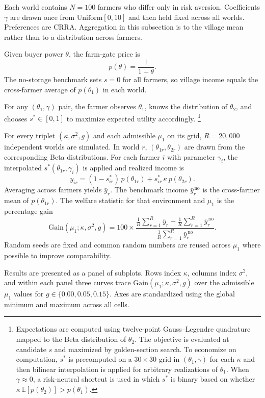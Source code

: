 Each world contains $N=100$ farmers who differ only in risk aversion. Coefficients $\gamma$ are drawn once from $\mathrm{Uniform}[0,10]$ and then held fixed across all worlds. Preferences are CRRA. Aggregation in this subsection is to the village mean rather than to a distribution across farmers.

Given buyer power $\theta$, the farm-gate price is
\[
p(\theta)=\frac{1}{1+\theta}.
\]
The no-storage benchmark sets $s=0$ for all farmers, so village income equals the cross-farmer average of $p(\theta_1)$ in each world.

For any $(\theta_1,\gamma)$ pair, the farmer observes $\theta_1$, knows the distribution of $\theta_2$, and chooses $s^*\in[0,1]$ to maximize expected utility accordingly. \footnote{Expectations are computed using twelve-point Gauss--Legendre quadrature mapped to the Beta distribution of $\theta_2$. The objective is evaluated at candidate $s$ and maximized by golden-section search. To economize on computation, $s^*$ is precomputed on a $30\times 30$ grid in $(\theta_1,\gamma)$ for each $\kappa$ and then bilinear interpolation is applied for arbitrary realizations of $\theta_1$. When $\gamma\approx 0$, a risk-neutral shortcut is used in which $s^*$ is binary based on whether $\kappa\,\mathbb{E}[p(\theta_2)]>p(\theta_1)$.}

For every triplet $(\kappa,\sigma^2,g)$ and each admissible $\mu_1$ on its grid, $R=20{,}000$ independent worlds are simulated. In world $r$, $(\theta_{1r},\theta_{2r})$ are drawn from the corresponding Beta distributions. For each farmer $i$ with parameter $\gamma_i$, the interpolated $s^*(\theta_{1r},\gamma_i)$ is applied and realized income is
\[
y_{ir}=(1-s^*_{ir})\,p(\theta_{1r})+s^*_{ir}\,\kappa\,p(\theta_{2r}).
\]
Averaging across farmers yields $\bar y_{r}$. The benchmark income $\bar y^{\,\text{no}}_{r}$ is the cross-farmer mean of $p(\theta_{1r})$. The welfare statistic for that environment and $\mu_1$ is the percentage gain
\[
\mathrm{Gain}(\mu_1;\kappa,\sigma^2,g)=100\times
\frac{\frac{1}{R}\sum_{r=1}^R \bar y_{r}-\frac{1}{R}\sum_{r=1}^R \bar y^{\,\text{no}}_{r}}
{\frac{1}{R}\sum_{r=1}^R \bar y^{\,\text{no}}_{r}}.
\]
Random seeds are fixed and common random numbers are reused across $\mu_1$ where possible to improve comparability.

Results are presented as a panel of subplots. Rows index $\kappa$, columns index $\sigma^2$, and within each panel three curves trace $\mathrm{Gain}(\mu_1;\kappa,\sigma^2,g)$ over the admissible $\mu_1$ values for $g\in\{0.00,0.05,0.15\}$. Axes are standardized using the global minimum and maximum across all cells.

